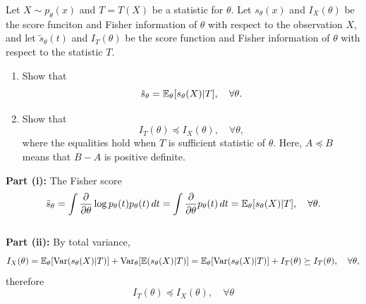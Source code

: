 \documentclass{article}
\begin{document}
\begin{homeworkProblem}
  Let $X \sim p_\theta(x)$ and $T=T(X)$ be a statistic for $\theta$. Let $s_\theta(x)$ and $I_X(\theta)$ be the score funciton and Fisher
  information of $\theta$ with respect to the observation $X$, and let $\tilde{s}_\theta(t)$ and $I_T(\theta)$ be the score function and Fisher information
  of $\theta$ with respect to the statistic $T$.
  \begin{enumerate}[label=\roman*), topsep=5pt, itemsep=5pt]
    \item Show that
          \[
            \tilde{s}_\theta = \mathbb{E}_\theta[s_\theta(X)|T], \quad \forall\theta.
          \]
    \item Show that
          \[
            I_T(\theta) \preceq I_X(\theta), \quad \forall\theta,
          \]
          where the equalities hold when $T$ is sufficient statistic of $\theta$. Here, $A \preceq B$ means that $B-A$ is positive definite. \newline
  \end{enumerate}

  \solution

  \textbf{Part (i):} The Fisher score
  \[
    \tilde{s}_\theta = \int \frac{\partial}{\partial \theta} \log p_\theta(t) p_\theta(t) \, dt = \int \frac{\partial}{\partial \theta} p_\theta(t) \, dt = \mathbb{E}_\theta[s_\theta(X)|T], \quad \forall\theta.
  \] \\

  \textbf{Part (ii):} By total variance,
  \[
    I_X(\theta) = \mathbb{E}_\theta[\operatorname{Var}(s_\theta(X)|T)] + \operatorname{Var}_\theta[\mathbb{E}(s_\theta(X)|T)] = \mathbb{E}_\theta[\operatorname{Var}(s_\theta(X)|T)] + I_T(\theta) \succeq I_T(\theta), \quad \forall\theta,
  \]
  therefore
  \[
    I_T(\theta) \preceq I_X(\theta), \quad \forall\theta
  \]
\end{homeworkProblem}

\pagebreak
\end{document}
